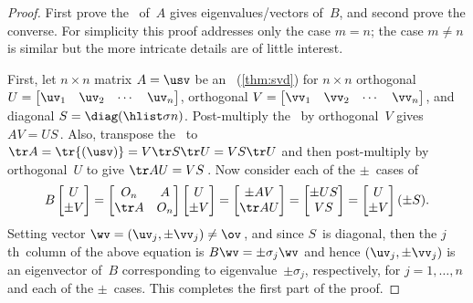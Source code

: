 \begin{proof} 
First prove the \svd\ of~\(A\) gives eigenvalues\slash vectors of~\(B\), and second prove the converse.
For simplicity this proof addresses only the case \(m=n\); the case \(m\neq n\) is similar but the more intricate details are of little interest.

First, let \(n\times n\) matrix \(A=\usv\) be an \svd\ (\autoref{thm:svd}) for \(n\times n\) orthogonal \(U=\begin{bmatrix} \uv_1&\uv_2&\cdots&\uv_n \end{bmatrix}\),  orthogonal \(V=\begin{bmatrix} \vv_1&\vv_2&\cdots&\vv_n \end{bmatrix}\), and diagonal \(S=\diag(\hlist\sigma n)\).
Post-multiply the \svd\ by orthogonal~\(V\) gives \(AV=US\)\,.
Also, transpose the \svd\ to \(\tr A=\tr{(\usv)}=V\tr S\tr U=VS\tr U\) and then post-multiply by orthogonal~\(U\) to give \(\tr AU=VS\)\,.
Now consider each of the \(\pm\)~cases of
\begin{equation*}
B\begin{bmatrix} U\\\pm V \end{bmatrix}
=\begin{bmatrix} O_n&A\\\tr A&O_n \end{bmatrix}\begin{bmatrix} U\\\pm V \end{bmatrix}
=\begin{bmatrix} \pm AV\\\tr AU \end{bmatrix}
=\begin{bmatrix} \pm US\\VS \end{bmatrix}
=\begin{bmatrix} U\\\pm V \end{bmatrix}(\pm S).
\end{equation*}
Setting vector \(\wv=(\uv_j,\pm\vv_j)\neq\ov\)\,, and since \(S\)~is diagonal, then the \(j\)th~column of the above equation is \(B\wv=\pm\sigma_j\wv\) and hence \((\uv_j,\pm\vv_j)\) is an eigenvector of~\(B\) corresponding to eigenvalue~\(\pm\sigma_j\), respectively, for \(j=1,\ldots,n\) and each of the \(\pm\)~cases.
This completes the first part of the proof.


\end{proof}
